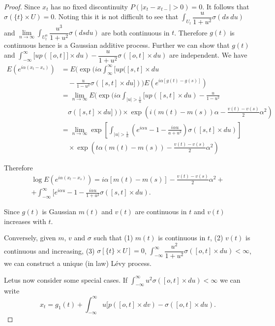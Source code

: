 \begin{proof}
Since $x_t$ has no fixed discontinuity $P (| x_t - x_{t-} | > 0) = 0$. 
It follows that $\sigma ( \{ t\} \times U) =0$. Noting this it is not
difficult to see that $\int_{U_t} \dfrac{u}{1+u^2} \sigma (ds\ du)$ and
$\lim\limits_{n \to \infty} \int_{U_t^n} \dfrac{u^3}{1+u^2} \sigma (ds
du)$ are both continuous in $t$. Therefore $g(t)$ is continuous hence
is a Gaussian additive process. Further we can show that $g(t)$ and
$\int_{- \infty}^\infty [ u p( [o,t]] \times du) - \dfrac{u}{1+u^2}
\sigma ([o,t] \times du)$ are independent. We have 
\begin{align*}
  E(e^{i \alpha (x_t - x_s)}) &= E (\exp( i \alpha \int_{\infty}^\infty [
    u p ( [s,t] \times du \\
    & \quad - \frac{u}{1-u^2} \sigma ([s,t] \times du] ))
  E(e^{i \alpha [ g(t) - g(s)]})\\ 
  &=\lim_{n \to \infty} E ( \exp ( i \alpha  \int_{| u  |  >
    \frac{1}{n}} [ u p ( [s,t] \times du) - \frac{u}{1-u^2}\\ 
    &\quad \sigma ([s,t] \times du] )) \times  \exp  \left(i (m (t) -
  m (s)) \alpha - \frac{v(t) - v(s)}{2} \alpha^2 \right) \\ 
  &= \lim_{n \to \infty} \exp \left[\int_{| u  |  > \frac{1}{n}}(e^{ i
      \alpha u}- 1- \frac{i \alpha u}{a+u^2}) \sigma ( [s,t] \times
    du)\right]\\ 
  & \quad \times \exp \left(t \alpha (m(t)- m(s))- \frac{v(t) - v(s)}{2}
  \alpha^2 \right)  
\end{align*}\pageoriginale 
 
Therefore 
 \begin{multline*}
   \log E(e^{i \alpha (x_t - x_s)}) = i \alpha [ m (t) - m(s)]-
   \frac{v(t) - v(s)}{2} \alpha^2+\\    
  + \int_{- \infty}^\infty [ e^{i
       \alpha u}- 1 - \frac{i \alpha u}{1+u^2} \sigma ([s,t] \times du).  
 \end{multline*}
 
Since $g(t)$ is Gaussian $m(t)$ and $v(t)$ are continuous in $t$ and
$v(t)$ increases with $t$. 

Conversely, given $m$, $v$ and $\sigma$ such that (1) $m(t)$ is
continuous in $t$, (2) 
$v(t)$ is continuous and increasing, (3) $\sigma [ \{ t\} \times U] =0$,
$\int_{- \infty}^\infty \dfrac{u^2}{1+u^2} \sigma ( [o,t] \times du)
<\infty$, we can construct a unique (in law)  L\'evy process. 

Let\pageoriginale us now consider some special cases. If $\int_{-
  \infty}^\infty u^2 
\sigma ([o,t] \times du ) < \infty$ we can write 
$$
x_t = g_1 (t)  + \int_{- \infty}^\infty u[p ( [o,t] \times dv)- \sigma
  ([o,t] \times du). 
$$
 

\end{proof}
